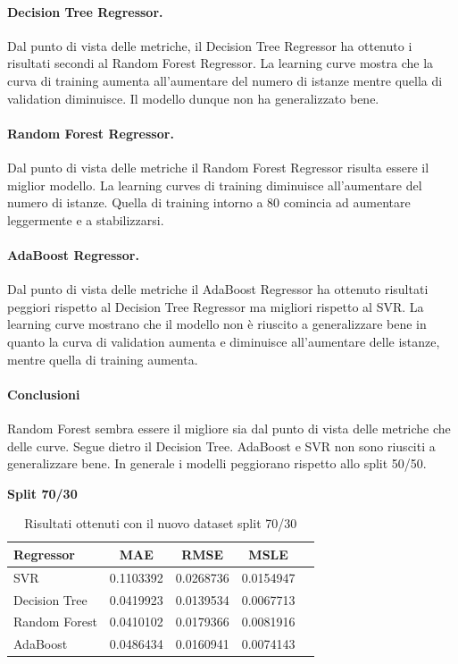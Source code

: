 \paragraph{\textbf{Decision Tree Regressor}.}
Dal punto di vista delle metriche, il Decision Tree Regressor ha ottenuto i risultati secondi al Random Forest Regressor. 
La learning curve mostra che la curva di training aumenta all'aumentare del numero di istanze mentre quella di validation diminuisce. Il modello dunque non ha generalizzato bene.
\paragraph{\textbf{Random Forest Regressor}.}
Dal punto di vista delle metriche il Random Forest Regressor risulta essere il miglior modello.
La learning curves di training diminuisce all'aumentare del numero di istanze. Quella di training intorno a 80 comincia ad aumentare leggermente e a stabilizzarsi.
\paragraph{\textbf{AdaBoost Regressor}.}
Dal punto di vista delle metriche il AdaBoost Regressor ha ottenuto risultati peggiori rispetto al Decision Tree Regressor ma migliori rispetto al SVR.
La learning curve mostrano che il modello non è riuscito a generalizzare bene
in quanto la curva di validation aumenta e diminuisce all'aumentare delle istanze, mentre quella di training aumenta.

\paragraph{\textbf{Conclusioni}} Random Forest sembra essere il migliore sia dal punto di vista delle metriche che delle curve. Segue dietro il Decision Tree. AdaBoost e SVR non sono riusciti a generalizzare bene. In generale i modelli peggiorano rispetto allo split 50/50.




\noindent\textbf{Split 70/30}

\begin{table}[H]
    \centering
    \begin{tabular}{|>{\centering\arraybackslash}m{5cm}|c|c|c|c|}
        \hline
        \textbf{Regressor} & \textbf{MAE} & \textbf{RMSE} & \textbf{MSLE} \\ [10pt]
        \hline
        SVR & 0.1103392 & 0.0268736 & 0.0154947 \\ [10pt]
        \hline
        Decision Tree & 0.0419923 & 0.0139534 & 0.0067713 \\ [10pt]
        \hline
        Random Forest & 0.0410102 & 0.0179366 & 0.0081916 \\ [10pt]
        \hline
        AdaBoost & 0.0486434 & 0.0160941 & 0.0074143 \\ [10pt]
        \hline
    \end{tabular}
    \caption{Risultati ottenuti con il nuovo dataset split 70/30}
    \label{tab:results} 
\end{table}


